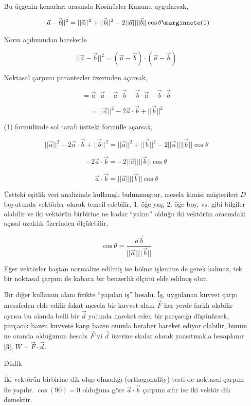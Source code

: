 \documentclass[12pt,fleqn]{article}\usepackage{../../common}
\begin{document}
Bu üçgenin kenarları arasında Kosinüsler Kanunu uygularsak,

$$
||\vec{a}-\vec{b}||^2 =
||\vec{a}||^2 + ||\vec{b}||^2 -
2 ||\vec{a}|| ||\vec{b}|| \cos\theta
\mlabel{1}
$$

Norm açılımından hareketle

$$
||\vec{a}-\vec{b}||^2 = (\vec{a}-\vec{b}) \cdot (\vec{a}-\vec{b}) 
$$

Noktasal çarpımı parantezler üzerinden açarsak,

$$
= \vec{a}\cdot\vec{a} - \vec{a}\cdot\vec{b} - \vec{b}\cdot\vec{a} + \vec{b}\cdot\vec{b}
$$

$$
= ||\vec{a}||^2 - 2\vec{a}\cdot\vec{b} + ||\vec{b}||^2
$$

(1) formülünde sol tarafı üstteki formülle açarsak,

$$
||\vec{a}||^2 - 2\vec{a}\cdot\vec{b} + ||\vec{b}||^2 =
||\vec{a}||^2 + ||\vec{b}||^2 - 2 ||\vec{a}|| ||\vec{b}|| \cos\theta
$$

$$
- 2\vec{a}\cdot\vec{b} = - 2 ||\vec{a}|| ||\vec{b}|| \cos\theta
$$

$$
\vec{a}\cdot\vec{b} = ||\vec{a}|| ||\vec{b}|| \cos\theta
$$

Üstteki eşitlik veri analizinde kullanışlı bulunmuştur, mesela kimisi
müşterileri $D$ boyutunda vektörler olarak temsil edebilir, 1. öğe yaş, 2. öğe
boy, vs. gibi bilgiler olabilir ve iki vektörün birbirine ne kadar ``yakın''
olduğu iki vektörün arasındaki açısal uzaklık üzerinden ölçülebilir,

$$
\cos\theta = \frac{\vec{a}\vec{b}}{||\vec{a}|| ||\vec{b}||}
$$

Eğer vektörler baştan normalize edilmiş ise bölme işlemine de gerek kalmaz, tek
bir noktasal çarpım ile kabaca bir benzerlik ölçütü elde edilmiş olur.

Bir diğer kullanım alanı fizikte ``yapılan iş'' hesabı. İş, uygulanan kuvvet
çarpı mesafeden elde edilir fakat mesela bir kuvvet alanı $\vec{F}$ her yerde
farklı olabilir ayrıca bu alanda belli bir $\vec{d}$ yolunda hareket eden bir
parçacığı düşünürsek, parçacık bazen kuvvete karşı bazen onunla beraber hareket
ediyor olabilir, bunun ne oranda olduğunun hesabı $\vec{F}$'yi $\vec{d}$ üzerine
skalar olarak yansıtmakla hesaplanır [3], $W = \vec{F} \cdot \vec{d}$.

Diklik

İki vektörün birbirine dik olup olmadığı (orthogonality) testi de noktasal
çarpım ile yapılır. $\cos(90) = 0$ olduğuna göre $\vec{a}\cdot\vec{b}$ çarpımı
sıfır ise iki vektör dik demektir. 
\end{document}

